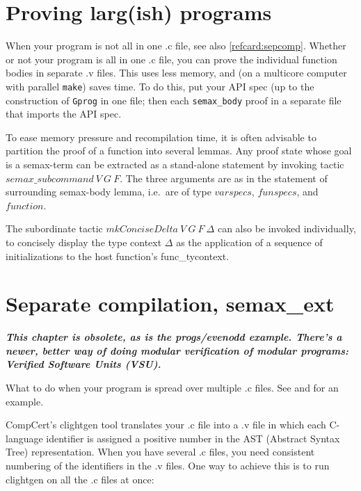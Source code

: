 \documentclass[12pt,fleqn,openany,oneside,showtrims]{memoir}
\begin{document}
\chapter{Proving larg(ish) programs}

When your program is not all in one .c file,
see also \autoref{refcard:sepcomp}.
Whether or not your program is all in one .c file,
you can prove the individual function bodies in separate .v files.
This uses less memory, and (on a multicore computer with
parallel \lstinline{make}) saves time.
To do this, put your API spec (up to the construction
of \lstinline{Gprog} in one file;
then each \lstinline{semax_body} proof in a separate file
that imports the API spec.

To ease memory pressure and recompilation time, it is often advisable
to partition the proof of a function into several lemmas. Any proof
state whose goal is a semax-term can be extracted as a stand-alone
statement by invoking tactic $\mathit{semax\_subcommand}\ V\ G\ F$.
The three arguments are as in the statement of surrounding semax-body
lemma, i.e.~are of type $\mathit{varspecs}$, $\mathit{funspecs}$, and
$\mathit{function}$.

\label{refcard:mkConciseDelta}
The subordinate tactic $\mathit{mkConciseDelta}\ V\ G\ F\ \Delta$ can
also be invoked individually, to concisely display the type context $\Delta$
as the application of a sequence of initializations
to the host function's func\_tycontext.



\chapter{Separate compilation, \upshape\textsf{semax\_ext}}
\label{refcard:sepcomp}

\textbf{\textit{This chapter is obsolete, as is the progs/evenodd
    example.  There's a newer, better way of doing modular
verification of modular programs:  Verified Software Units (VSU).}}

What to do when your program is spread over multiple .c files.
See  and  for an example.


CompCert's clightgen tool translates your .c file into a .v file
in which each C-language identifier is assigned a positive number
in the AST (Abstract Syntax Tree) representation.  When you have
several .c files, you need consistent numbering of the identifiers
in the .v files.  One way to achieve this is to run clightgen
on all the .c files at once:
\end{document}
